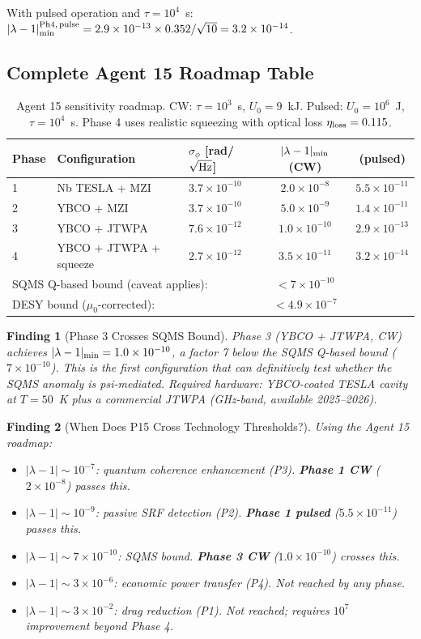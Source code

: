 \documentclass[11pt]{article}
\newtheorem{finding}{Finding}
\newcommand{\ee}[1]{\times 10^{#1}}
\begin{document}
With pulsed operation and $\tau = 10^4$~s: $|\lambda-1|_{\rm min}^{\rm Ph4,\,pulse}
= 2.9\ee{-13} \times 0.352 / \sqrt{10} = 3.2\ee{-14}$.

\subsection{Complete Agent 15 Roadmap Table}

\begin{table}[h]
\centering
\caption{Agent 15 sensitivity roadmap. CW: $\tau = 10^3$~s, $U_0 = 9$~kJ.
Pulsed: $U_0 = 10^6$~J, $\tau = 10^4$~s. Phase 4 uses realistic squeezing
with optical loss $\eta_{\rm loss} = 0.115$.}
\label{tab:a15-roadmap}
\begin{tabular}{lllcc}
\toprule
Phase & Configuration & $\sigma_\phi$ [rad/$\sqrt{\rm Hz}$] & $|\lambda-1|_{\rm min}$ (CW) & (pulsed) \\
\midrule
1 & Nb TESLA + MZI & $3.7\ee{-10}$ & $2.0\ee{-8}$ & $5.5\ee{-11}$ \\
2 & YBCO + MZI & $3.7\ee{-10}$ & $5.0\ee{-9}$ & $1.4\ee{-11}$ \\
3 & YBCO + JTWPA & $7.6\ee{-12}$ & $1.0\ee{-10}$ & $2.9\ee{-13}$ \\
4 & YBCO + JTWPA + squeeze & $2.7\ee{-12}$ & $3.5\ee{-11}$ & $3.2\ee{-14}$ \\
\midrule
\multicolumn{3}{l}{SQMS Q-based bound (caveat applies):} & $< 7\ee{-10}$ & \\
\multicolumn{3}{l}{DESY bound ($\mu_0$-corrected):} & $< 4.9\ee{-7}$ & \\
\bottomrule
\end{tabular}
\end{table}

\begin{finding}[Phase 3 Crosses SQMS Bound]
Phase 3 (YBCO + JTWPA, CW) achieves $|\lambda-1|_{\rm min} = 1.0\ee{-10}$,
a factor 7 below the SQMS Q-based bound ($7\ee{-10}$). This is the first
configuration that can definitively test whether the SQMS anomaly is
psi-mediated. Required hardware: YBCO-coated TESLA cavity at $T = 50$~K
plus a commercial JTWPA (GHz-band, available 2025--2026).
\end{finding}

\begin{finding}[When Does P15 Cross Technology Thresholds?]
\label{find:a15-thresholds}
Using the Agent 15 roadmap:
\begin{itemize}
\item $|\lambda-1| \sim 10^{-7}$: quantum coherence enhancement (P3). \textbf{Phase 1 CW} ($2\ee{-8}$) passes this.
\item $|\lambda-1| \sim 10^{-9}$: passive SRF detection (P2). \textbf{Phase 1 pulsed} ($5.5\ee{-11}$) passes this.
\item $|\lambda-1| \sim 7\ee{-10}$: SQMS bound. \textbf{Phase 3 CW} ($1.0\ee{-10}$) crosses this.
\item $|\lambda-1| \sim 3\ee{-6}$: economic power transfer (P4). Not reached by any phase.
\item $|\lambda-1| \sim 3\ee{-2}$: drag reduction (P1). Not reached; requires $10^7$ improvement beyond Phase 4.
\end{itemize}
\end{finding}
\end{document}
